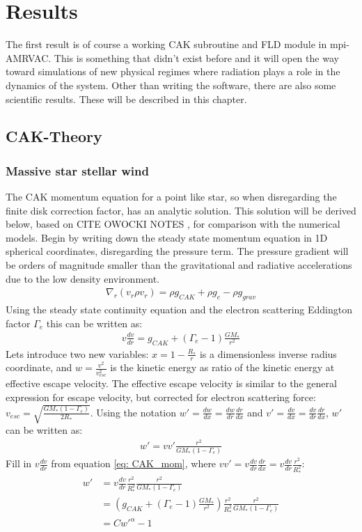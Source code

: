 \chapter{Results}
The first result is of course a working CAK subroutine and FLD module in mpi-AMRVAC. This is something that didn't exist before and it will open the way toward simulations of new physical regimes where radiation plays a role in the dynamics of the system. Other than writing the software, there are also some scientific results. These will be described in this chapter.

\section{CAK-Theory}
\subsection{Massive star stellar wind}
The CAK momentum equation for a point like star, so when disregarding the finite disk correction factor, has an analytic solution. This solution will be derived below, based on CITE OWOCKI NOTES \citep{}, for comparison with the numerical models. Begin by writing down the steady state momentum equation in 1D spherical coordinates, disregarding the pressure term. The pressure gradient will be orders of magnitude smaller than the gravitational and radiative accelerations due to the low density environment. 
\begin{align}
\nabla_r \left(v_r \rho v_r \right) = \rho g_{CAK} + \rho g_{e} - \rho g_{grav}
\end{align}
Using the steady state continuity equation and the electron scattering Eddington factor $\Gamma_e$ this can be written as:
\begin{align}
v \frac{d v}{d r} = g_{CAK} + (\Gamma_e-1) \frac{G M_*}{r^2} \label{eq: CAK_mom}
\end{align}
Lets introduce two new variables: $x = 1- \frac{R_*}{r}$ is a dimensionless inverse radius coordinate, and $w = \frac{v^2}{v_{esc}^2}$ is the kinetic energy as ratio of the kinetic energy at effective escape velocity. The effective escape velocity is similar to the general expression for escape velocity, but corrected for electron scattering force: $v_{esc} = \sqrt{\frac{G M_* (1- \Gamma_e)}{2 R_*}}$. Using the notation $w' = \frac{dw}{dx} = \frac{dw}{dr}\frac{dr}{dx}$ and $v' = \frac{dv}{dx} = \frac{dv}{dr} \frac{dr}{dx}$, $w'$ can be written as:
\begin{align}
w' = vv' \frac{r^2}{G M_* (1- \Gamma_e)}
\end{align}
Fill in $v\frac{dv}{dr}$ from equation \eqref{eq: CAK_mom}, where $vv' = v \frac{dv}{dr} \frac{dr}{dx} = v \frac{dv}{dr} \frac{r^2}{R_*^2}$:
\begin{align}
w' &= v \frac{dv}{dr}  \frac{r^2}{R_*^2} \frac{r^2}{G M_* (1- \Gamma_e)} \\
   &= \left( g_{CAK} + (\Gamma_e-1) \frac{G M_*}{r^2} \right)  \frac{r^2}{R_*^2} \frac{r^2}{G M_* (1- \Gamma_e)}\\
   &= C w'^\alpha - 1 \label{eq: CAK_w}
\end{align}

